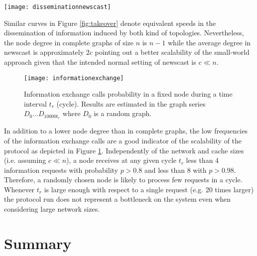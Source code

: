 \begin{figure*}[htbp]
\centerline{\texttt{[image: disseminationnewscast]}
}
\caption{Dissemination speed of a news item through the entire network for a complete graph and two newscast graphs with $c=10$ and $c=20$. Results are averaged from 50 independent runs for a network size of $n=1600$.}
\label{fig:takeover}
\end{figure*}

Similar curves in Figure \ref{fig:takeover} denote equivalent speeds in the dissemination of information induced by both kind of topologies.  Nevertheless, the node degree in complete graphs of size $n$ is $n-1$ while the average degree in newscast is approximately $2c$ pointing out a better scalability of the small-world approach given that the intended normal setting of newscast is $c \ll n$.



\begin{figure}[htbp]
\centerline{\texttt{[image: informationexchange]}}
\caption{ Information exchange calls probability in a fixed node during a time interval $t_r$ (cycle). Results are estimated in the graph series $D_0 \dots D_{10000t_r}$ where $D_0$ is a random graph.}
\label{fig:informationexchange}
\end{figure}

\bigskip
\bigskip

In addition to a lower node degree than in complete graphs, the low frequencies of the information exchange calls are a good indicator of the scalability of the protocol as depicted in Figure \ref{fig:informationexchange}. Independently of the network and cache sizes (i.e. assuming $c \ll n$), a node receives at any given cycle $t_r$ less than 4 information requests with probability $p > 0.8$ and less than 8 with $p > 0.98$. Therefore, a randomly chosen node is likely to process few requests in a cycle. Whenever $t_r$ is large enough with respect to a single request (e.g. 20 times larger) the protocol run does not represent a bottleneck on the system even when considering large network sizes.



\section{Summary}
\label{sec:p2pconclusions}

